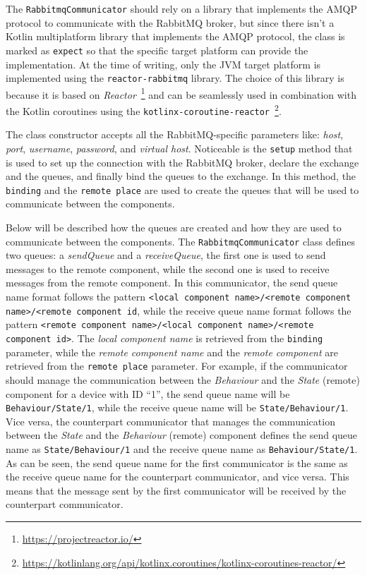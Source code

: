 The \texttt{RabbitmqCommunicator} should rely on a library that implements the AMQP protocol to communicate with the RabbitMQ broker, but since
there isn't a Kotlin multiplatform library that implements the AMQP protocol, the class is marked as \texttt{expect} so that the specific target
platform can provide the implementation. At the time of writing, only the JVM target platform is implemented using the \texttt{reactor-rabbitmq}
library. The choice of this library is because it is based on \emph{Reactor}~\footnote{\url{https://projectreactor.io/}} and can be seamlessly used
in combination with the Kotlin coroutines using the
\texttt{kotlinx-coroutine-reactor}~\footnote{\url{https://kotlinlang.org/api/kotlinx.coroutines/kotlinx-coroutines-reactor/}}.

The class constructor accepts all the RabbitMQ-specific parameters like: \emph{host}, \emph{port}, \emph{username}, \emph{password}, and
\emph{virtual host}.
Noticeable is the \texttt{setup} method that is used to set up the connection with the RabbitMQ broker, declare the exchange and the queues, and
finally bind the queues to the exchange. In this method, the \texttt{binding} and the \texttt{remote place} are used to create the queues that will
be used to communicate between the components.

Below will be described how the queues are created and how they are used to communicate between the components.
The \texttt{RabbitmqCommunicator} class defines two queues: a \emph{sendQueue} and a \emph{receiveQueue}, the first one is used to send messages to
the remote component, while the second one is used to receive messages from the remote component.
In this communicator, the send queue name format follows the pattern \texttt{<local component name>/<remote component name>/<remote component id},
while the receive queue name format follows the pattern \texttt{<remote component name>/<local component name>/<remote component id>}.
The \emph{local component name} is retrieved from the \texttt{binding} parameter, while the \emph{remote component name} and the
\emph{remote component} are retrieved from the \texttt{remote place} parameter.
For example, if the communicator should manage the communication between the \emph{Behaviour} and the \emph{State} (remote) component for a device
with ID ``1'', the send queue name will be \texttt{Behaviour/State/1}, while the receive queue name will be \texttt{State/Behaviour/1}.
Vice versa, the counterpart communicator that manages the communication between the \emph{State} and the \emph{Behaviour} (remote) component
defines the send queue name as \texttt{State/Behaviour/1} and the receive queue name as \texttt{Behaviour/State/1}.
As can be seen, the send queue name for the first communicator is the same as the receive queue name for the counterpart communicator, and vice versa.
This means that the message sent by the first communicator will be received by the counterpart communicator.

